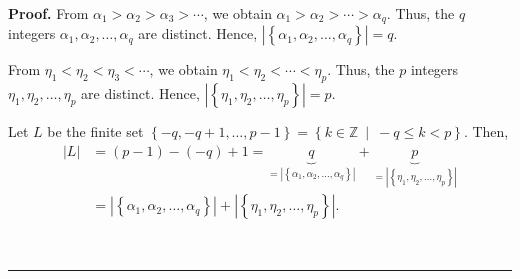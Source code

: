 \documentclass[numbers=enddot,12pt,final,onecolumn,notitlepage]{scrartcl}%
\theoremstyle{definition}
\newenvironment{proof}[1][Proof]{\noindent\textbf{#1.} }{\ \rule{0.5em}{0.5em}}
\newenvironment{verlong}{}{}
\begin{document}
\begin{verlong}
\begin{proof}
From $\alpha_{1}>\alpha_{2}>\alpha_{3}>\cdots$, we obtain $\alpha_{1}%
>\alpha_{2}>\cdots>\alpha_{q}$. Thus, the $q$ integers $\alpha_{1},\alpha
_{2},\ldots,\alpha_{q}$ are distinct. Hence, $\left\vert \left\{  \alpha
_{1},\alpha_{2},\ldots,\alpha_{q}\right\}  \right\vert =q$.

From $\eta_{1}<\eta_{2}<\eta_{3}<\cdots$, we obtain $\eta_{1}<\eta_{2}%
<\cdots<\eta_{p}$. Thus, the $p$ integers $\eta_{1},\eta_{2},\ldots,\eta_{p}$
are distinct. Hence, $\left\vert \left\{  \eta_{1},\eta_{2},\ldots,\eta
_{p}\right\}  \right\vert =p$.

Let $L$ be the finite set $\left\{  -q,-q+1,\ldots,p-1\right\}  =\left\{
k\in\mathbb{Z}\ \mid\ -q\leq k<p\right\}  $. Then,
\begin{align*}
\left\vert L\right\vert  &  =\left(  p-1\right)  -\left(  -q\right)
+1=\underbrace{q}_{=\left\vert \left\{  \alpha_{1},\alpha_{2},\ldots
,\alpha_{q}\right\}  \right\vert }+\underbrace{p}_{=\left\vert \left\{
\eta_{1},\eta_{2},\ldots,\eta_{p}\right\}  \right\vert }\\
&  =\left\vert \left\{  \alpha_{1},\alpha_{2},\ldots,\alpha_{q}\right\}
\right\vert +\left\vert \left\{  \eta_{1},\eta_{2},\ldots,\eta_{p}\right\}
\right\vert .
\end{align*}



\end{proof}
\end{verlong}
\end{document}
